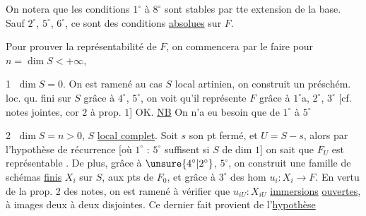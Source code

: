 On notera que les conditions $1^\circ$ à $8^\circ$ sont stables par tte extension de la base. Sauf $2^\circ$, $5^\circ$, $6^\circ$, ce sont des conditions \uline{absolues} sur $F$.

Pour prouver la représentabilité de $F$, on commencera par le faire pour $n=\dim S<+\infty$, 

\textcircled{1} $\dim S=0$. On est ramené au cas $S$ local artinien, on construit un préschém. loc. qu. fini sur $S$ grâce à \textcircled{$4^\circ$}, \textcircled{$5^\circ$}, on voit qu'il représente $F$ grâce à \textcircled{$1^\circ$}a, \textcircled{$2^\circ$}, \textcircled{$3^\circ$} [cf. notes jointes, cor $2$ à prop. $1$] OK. \uline{NB} On n'a eu besoin que de $1^\circ$ à $5^\circ$

\textcircled{2} $\dim S=n>0$, $S$ \uline{local complet}. Soit $s$ son pt fermé, \deleted{\unsure{---}} et $U=S-s$, alors par l'hypothèse de récurrence [où \textcircled{$1^\circ$} : \textcircled{$5^\circ$} suffisent si $S$ de dim $1$] on sait que $F_U$ est représentable . De plus, grâce à \textcircled{$\unsure{4^\circ|2^\circ}$}, \textcircled{$5^\circ$}, on construit une famille de schémas \uline{finis} $X_i$ sur $S$,   aux pts de $F_0$, et  grâce à \textcircled{$3^\circ$} des hom $u_i:X_i\longrightarrow F$. En vertu de la prop. $2$ des notes, on est ramené à vérifier que $u_{iU}:X_{iU}$ \uline{immersions} \uline{ouvertes}, à images deux à deux disjointes. Ce dernier fait provient de l'\uline{hypothèse}
